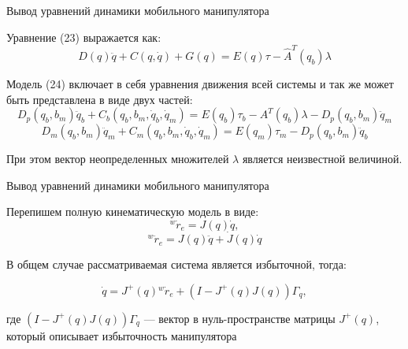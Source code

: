 \documentclass[newPxFont,numfooter,sectionpages]{beamer}
\begin{document}
\begin{frame}{Вывод уравнений динамики мобильного манипулятора }
	\begin{center}
		\begin{minipage}[b]{0.9\textwidth}
		Уравнение (23) выражается как:
\[
    D(q)\ddot{q} + C(q,\dot{q}) + G(q) = E(q)\tau - \hat{A}^T(q_b)\lambda 
	\tag{24} \label{eq:24}
\]

Модель (24) включает в себя уравнения движения всей системы и так же может быть представлена в виде двух частей:
\begin{equation*}
    D_p(q_b, b_m)\ddot{q}_b + C_b(q_b, b_m,\dot{q}_b,\dot{q}_m) = E(q_b)\tau_b - A^T(q_b)\lambda - D_p(q_b, b_m)\ddot{q}_m 
\end{equation*}
\begin{equation*}
    D_m(q_b, b_m)\ddot{q}_m + C_m(q_b, b_m,\dot{q}_b,\dot{q}_m) = E(q_m)\tau_m - D_p(q_b, b_m)\ddot{q}_b  
\end{equation*}		
		
		При этом вектор неопределенных множителей $\lambda$ является неизвестной величиной. 
		\end{minipage}
	\end{center}
\end{frame}

\begin{frame}{Вывод уравнений динамики мобильного манипулятора }
	\begin{center}
		\begin{minipage}[b]{0.9\textwidth}
		Перепишем полную кинематическую модель в виде:
		\begin{equation}
{^w\dot{r}_e} = J(q)\dot{q},
\tag{25} \label{eq:25}
\end{equation}
\begin{equation}
{^w\ddot{r}_e} = J(q)\ddot{q} + \dot{J}(q)\dot{q}
\tag{25} \label{eq:25}
\end{equation}

В общем случае рассматриваемая система является избыточной, тогда:

\begin{equation}
\dot{q} = J^{+}(q){^w\dot{r}_e} + (I - J^{+}(q)J(q))\Gamma_q,
\tag{26} \label{eq:26}
\end{equation}

\noindent
где $(I - J^{+}(q)J(q))\Gamma_q$ --- вектор в нуль-пространстве матрицы $J^{+}(q)$, который описывает избыточность манипулятора
		\end{minipage}
	\end{center}
\end{frame}
\end{document}
